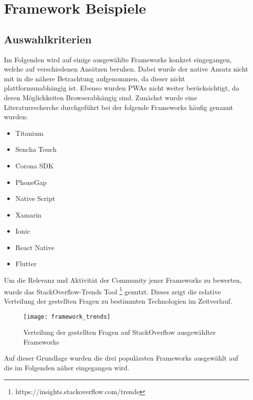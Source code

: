 \chapter{Framework Beispiele}

\section{Auswahlkriterien}

Im Folgenden wird auf einige ausgewählte Frameworks konkret eingegangen, welche auf verschiedenen Ansätzen beruhen. Dabei wurde der native Ansatz nicht mit in die nähere Betrachtung aufgenommen, da dieser nicht plattformunabhängig ist. Ebenso wurden \ac{PWA}s nicht weiter berücksichtigt, da deren Möglichkeiten Browserabhängig sind. Zunächst wurde eine Literaturrecherche durchgeführt bei der folgende Frameworks häufig genannt wurden:

\begin{multicols}{3}
	\begin{itemize}
		\vspace{-2mm}
		\setlength\itemsep{0mm}
		\item Titanium
		\item Sencha Touch
		\item Corona SDK
		\item PhoneGap
		\item Native Script
		\item Xamarin
		\item Ionic
		\item React Native
		\item Flutter
	\end{itemize}
\end{multicols}



Um die Relevanz und Aktivität der Community jener Frameworks zu bewerten, wurde das StackOverflow-Trends Tool \footnote{https://insights.stackoverflow.com/trends} genutzt. Dieses zeigt die relative Verteilung der gestellten Fragen zu bestimmten Technologien im Zeitverlauf.

\begin{figure}[h]
	\texttt{[image: framework\_trends]}
	\centering
	\caption{Verteilung der gestellten Fragen auf StackOverflow ausgewählter Frameworks}
\end{figure}

Auf dieser Grundlage wurden die drei populärsten Frameworks ausgewählt auf die im Folgenden näher eingegangen wird.

